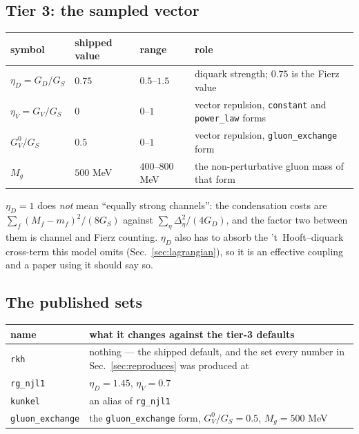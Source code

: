 \documentclass[aps,prc,onecolumn,superscriptaddress,nofootinbib,10pt]{revtex4-2}
\newcommand{\GS}{G_S}
\newcommand{\GD}{G_D}
\newcommand{\GV}{G_V}
\begin{document}
\subsection{Tier 3: the sampled vector}

\begin{center}
\begin{tabular}{llll}
\toprule
symbol & shipped value & range & role \\
\midrule
$\eta_D = \GD/\GS$    & $0.75$ & $0.5$--$1.5$ & diquark strength; $0.75$ is the Fierz value \\
$\eta_V = \GV/\GS$    & $0$    & $0$--$1$     & vector repulsion, \texttt{constant} and \texttt{power\_law} forms \\
$\GV^0/\GS$           & $0.5$  & $0$--$1$     & vector repulsion, \texttt{gluon\_exchange} form \\
$M_g$                 & $500$ MeV & $400$--$800$ MeV & the non-perturbative gluon mass of that form \\
\bottomrule
\end{tabular}
\end{center}

$\eta_D = 1$ does \emph{not} mean ``equally strong channels'': the
condensation costs are $\sum_f (M_f - m_f)^2/(8\GS)$ against
$\sum_\eta \Delta_\eta^2/(4\GD)$, and the factor two between them is channel
and Fierz counting. $\eta_D$ also has to absorb the 't~Hooft--diquark
cross-term this model omits (Sec.~\ref{sec:lagrangian}), so it is an effective
coupling and a paper using it should say so.

\subsection{The published sets}

\begin{center}
\begin{tabular}{ll}
\toprule
name & what it changes against the tier-3 defaults \\
\midrule
\texttt{rkh} & nothing --- the shipped default, and the set every number in
  Sec.~\ref{sec:reproduces} was produced at \\
\texttt{rg\_njl1} & $\eta_D = 1.45$, $\eta_V = 0.7$ \\
\texttt{kunkel} & an alias of \texttt{rg\_njl1} \\
\texttt{gluon\_exchange} & the \texttt{gluon\_exchange} form,
  $\GV^0/\GS = 0.5$, $M_g = 500$ MeV \\
\bottomrule
\end{tabular}
\end{center}
\end{document}

